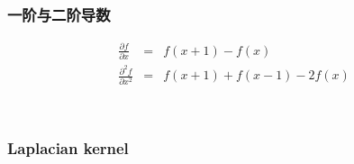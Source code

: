 \documentclass{beamer}
\begin{document}
{{\begin{frame}
  \
  
  \
  
\end{frame}}{\begin{frame}
  \frametitle{一阶与二阶导数}
  \begin{eqnarray*}
    \frac{\partial f}{\partial x} & = & f (x + 1) - f (x)\\
    \frac{\partial^2 f}{\partial x^2} & = & f (x + 1) + f (x - 1) - 2 f (x)
  \end{eqnarray*}
\end{frame}}{\begin{frame}
  \
  
  \quad{}
\end{frame}}{\begin{frame}
  \frametitle{Laplacian kernel}
  
  \
  

\end{frame}}}
\end{document}
